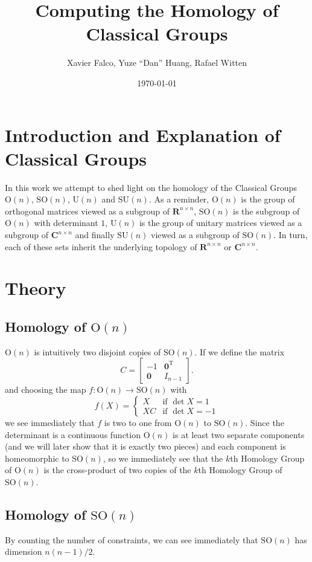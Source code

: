 \documentclass[letterpaper,11pt]{article}
\title{Computing the Homology of Classical Groups}
\author{Xavier Falco, Yuze ``Dan'' Huang, Rafael Witten}
\date{\today}
\newcommand{\Tr}{^\text{T}}
\newcommand{\zeros}{\mathbf{0}}
\newcommand{\reals}{\mathbf{R}}
\newcommand{\complexes}{\mathbf{C}}
\newcommand{\MG}[2]{{\text{#1}(#2)}}
\newcommand{\Un}{\MG{U}{n}}
\newcommand{\On}{\MG{O}{n}}
\newcommand{\SUn}{\MG{SU}{n}}
\newcommand{\SOn}{\MG{SO}{n}}
\begin{document}
\maketitle
\thispagestyle{empty}
\section{Introduction and Explanation of Classical Groups}

In this work we attempt to shed light on the homology of the Classical Groups $\On$, $\SOn$, $\Un$ and $\SUn$. As a reminder, $\On$ is the group of orthogonal matrices viewed as a subgroup of $\reals^{n \times n}$, $\SOn$ is the subgroup of $\On$ with determinant $1$, $\Un$ is the group of unitary matrices viewed as a subgroup of $\complexes^{n\times n}$ and finally $\SUn$ viewed as a subgroup of $\SOn$. In turn, each of these sets inherit the underlying topology of $\reals^{n \times n}$ or $\complexes^{n \times n}$.

\section{Theory}

\subsection{Homology of $\On$}

$\On$ is intuitively two disjoint copies of $\SOn$. If we define the matrix
\[
  C = \begin{bmatrix}-1 & \zeros\Tr\\ \zeros & I_{n-1} \end{bmatrix}.
\]
and choosing the map $f:\On\to\SOn$ with
\[
  f(X) = \left\{
\begin{array}{ll}
  X & \mbox{if }\det{X} = 1\\
 XC & \mbox{if }\det{X} = -1
\end{array}\right.
\]
we see immediately that $f$ is two to one from $\On$ to $\SOn$. Since the determinant is a continuous function $\On$ is at least two separate components (and we will later show that it is exactly two pieces) and each component is homeomorphic to $\SOn$, so we immediately see that the $k$th Homology Group of $\On$ is the cross-product of two copies of the $k$th Homology Group of $\SOn$.

\subsection{Homology of $\SOn$}
By counting the number of constraints, we can see immediately that $\SOn$ has dimension $n(n-1)/2$.
\end{document}
